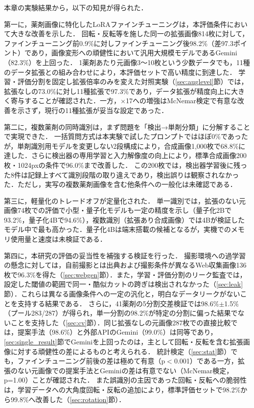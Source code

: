 \documentclass[dvipdfmx]{jsarticle}
\begin{document}
本章の実験結果から，以下の知見が得られた．

第一に，薬剤画像に特化したLoRAファインチューニングは，本評価条件において大きな改善を示した．
回転・反転等を施した同一の拡張画像814枚に対して，ファインチューニング前0.9\%に対しファインチューニング後98.2\%（差97.3ポイント）であり，画像変形への頑健性において汎用大規模モデルであるGemini（82.3\%）を上回った．
1薬剤あたり元画像3〜10枚という少数データでも，11種のデータ拡張との組み合わせにより，本評価セットで高い精度に到達した．
学習・評価分割を固定し拡張倍率のみを変えた対照実験（\ref{sec:auglevel}節）では，拡張なしの73.0\%に対し11種拡張で97.3\%であり，データ拡張が精度向上に大きく寄与することが確認された．一方，$\times$17への増強はMcNemar検定で有意な改善を示さず，現行の11種拡張が妥当な設定であった．

第二に，複数薬剤の同時識別は，まず問題を「検出→単剤分類」に分解することで実現できた．
一括質問方式は本実験で試したプロンプトではほぼ0\%であったが，単剤識別用モデルを変更しない2段構成により，合成画像1,000枚で68.8\%に達した．さらに検出器の専用学習と入力解像度の向上により，標準合成画像200枚・1024pxの条件で96.0\%まで改善した．
この200枚では，検出器学習後に残った8件は記録上すべて識別段階の取り違えであり，検出誤りは観察されなかった．ただし，実写の複数薬剤画像を含む他条件への一般化は未確認である．

第三に，軽量化のトレードオフが定量化された．
単一識別では，拡張のない元画像74枚での評価で小型・量子化モデルも一定の精度を示し（量子化2Bで93.2\%，量子化4Bで94.6\%），複数識別（拡張あり合成画像）では4Bが検証したモデル中で最も高かった．量子化4Bは端末搭載の候補となるが，実機でのメモリ使用量と速度は未検証である．

第四に，本研究の評価の妥当性を補強する検証を行った．
撮影環境への過学習の懸念に対しては，自前撮影とは出典および撮影条件が異なるWeb収集画像136枚で96.3\%を得た（\ref{sec:webgen}節）．また，学習・評価分割のリーク監査では，設定した閾値の範囲で同一・酷似カットの跨ぎは検出されなかった（\ref{sec:leak}節）．これらは異なる画像条件への一定の汎化と，明白なデータリークがないことを支持する結果である．
さらに，41薬剤の5分割交差検証では98.6\%$\pm$1.5\%（プール283/287）が得られ，単一分割の98.2\%が特定の分割に偏った結果でないことを支持した（\ref{sec:cv}節）．同じ拡張なしの元画像287枚での直接比較では，提案手法（98.6\%）と外部APIのGemini（99.0\%）は同等であり，\ref{sec:single_result}節でGeminiを上回ったのは，主として回転・反転を含む拡張画像に対する頑健性の差によるものと考えられる．
統計検定（\ref{sec:stat}節）でも，ファインチューニング前後の差は極めて有意（p$<$0.001）である一方，拡張のない元画像での提案手法とGeminiの差は有意でない（McNemar検定，p=1.00）ことが確認された．
また誤識別の主因であった回転・反転への脆弱性は，学習データへの大角度回転・反転の追加により，標準評価セットで98.2\%から99.8\%へ改善した（\ref{sec:rotation}節）．
\end{document}
